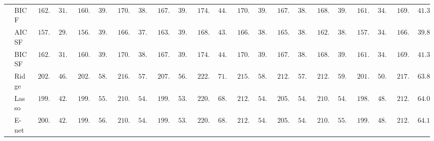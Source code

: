 \begin{tabular}{p{0.2cm}p{1cm}|p{0.6cm}p{0.6cm}|p{0.6cm}p{0.6cm}p{0.6cm}p{0.6cm}p{0.6cm}p{0.6cm}|p{0.6cm}p{0.6cm}p{0.6cm}p{0.6cm}p{0.6cm}p{0.6cm}|p{0.6cm}p{0.6cm}p{0.6cm}p{0.6cm}p{0.6cm}p{0.6cm}}
 & BIC F  & $\phantom{0}162.21$ & $\phantom{0}31.97$ & $\phantom{0}160.18$ & $\phantom{0}39.97$ & $\phantom{0}170.93$ & $\phantom{0}38.16$ & $\phantom{0}167.19$ & $\phantom{0}39.83$ & $\phantom{0}174.00$ & $\phantom{0}44.66$ & $\phantom{0}170.87$ & $\phantom{0}39.53$ & $\phantom{0}167.78$ & $\phantom{0}38.73$ & $\phantom{0}168.10$ & $\phantom{0}39.91$ & $\phantom{0}161.34$ & $\phantom{0}34.88$ & $\phantom{0}169.40$ & $\phantom{0}41.32$ \\
 & AIC SF  & $\phantom{0}157.50$ & $\phantom{0}29.94$ & $\phantom{0}156.28$ & $\phantom{0}39.28$ & $\phantom{0}166.61$ & $\phantom{0}37.03$ & $\phantom{0}163.85$ & $\phantom{0}39.37$ & $\phantom{0}168.70$ & $\phantom{0}43.02$ & $\phantom{0}166.59$ & $\phantom{0}38.30$ & $\phantom{0}165.35$ & $\phantom{0}38.54$ & $\phantom{0}162.98$ & $\phantom{0}38.26$ & $\phantom{0}157.47$ & $\phantom{0}34.20$ & $\phantom{0}166.48$ & $\phantom{0}39.89$ \\
 & BIC SF  & $\phantom{0}162.21$ & $\phantom{0}31.97$ & $\phantom{0}160.18$ & $\phantom{0}39.97$ & $\phantom{0}170.93$ & $\phantom{0}38.16$ & $\phantom{0}167.19$ & $\phantom{0}39.83$ & $\phantom{0}174.00$ & $\phantom{0}44.66$ & $\phantom{0}170.90$ & $\phantom{0}39.55$ & $\phantom{0}167.84$ & $\phantom{0}38.81$ & $\phantom{0}168.10$ & $\phantom{0}39.91$ & $\phantom{0}161.34$ & $\phantom{0}34.88$ & $\phantom{0}169.45$ & $\phantom{0}41.32$ \\
 & Ridge  & $\phantom{0}202.77$ & $\phantom{0}46.62$ & $\phantom{0}202.21$ & $\phantom{0}58.64$ & $\phantom{0}216.45$ & $\phantom{0}57.97$ & $\phantom{0}207.53$ & $\phantom{0}56.20$ & $\phantom{0}222.76$ & $\phantom{0}71.59$ & $\phantom{0}215.96$ & $\phantom{0}58.54$ & $\phantom{0}212.98$ & $\phantom{0}57.10$ & $\phantom{0}212.96$ & $\phantom{0}59.95$ & $\phantom{0}201.79$ & $\phantom{0}50.27$ & $\phantom{0}217.28$ & $\phantom{0}63.89$ \\
 & Lasso  & $\phantom{0}199.78$ & $\phantom{0}42.76$ & $\phantom{0}199.21$ & $\phantom{0}55.75$ & $\phantom{0}210.26$ & $\phantom{0}54.10$ & $\phantom{0}199.86$ & $\phantom{0}53.41$ & $\phantom{0}220.57$ & $\phantom{0}68.39$ & $\phantom{0}212.77$ & $\phantom{0}54.49$ & $\phantom{0}205.36$ & $\phantom{0}54.46$ & $\phantom{0}210.30$ & $\phantom{0}54.81$ & $\phantom{0}198.52$ & $\phantom{0}48.98$ & $\phantom{0}212.73$ & $\phantom{0}64.01$ \\
 & E-net  & $\phantom{0}200.40$ & $\phantom{0}42.61$ & $\phantom{0}199.66$ & $\phantom{0}56.25$ & $\phantom{0}210.12$ & $\phantom{0}54.72$ & $\phantom{0}199.43$ & $\phantom{0}53.79$ & $\phantom{0}220.80$ & $\phantom{0}68.36$ & $\phantom{0}212.83$ & $\phantom{0}54.45$ & $\phantom{0}205.34$ & $\phantom{0}54.57$ & $\phantom{0}210.89$ & $\phantom{0}55.38$ & $\phantom{0}199.13$ & $\phantom{0}48.99$ & $\phantom{0}212.90$ & $\phantom{0}64.13$ \\

\end{tabular}
